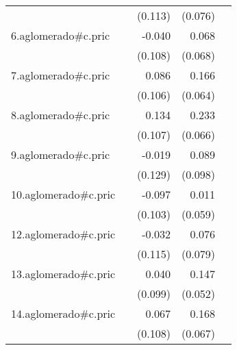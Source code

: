 {\begin{longtable}{l*{4}{D{.}{.}{-1}}}
            &                     &     (0.113)         &     (0.076)         &                     \\
\addlinespace
6.aglomerado#c.pric&                     &      -0.040         &       0.068         &                     \\
            &                     &     (0.108)         &     (0.068)         &                     \\
\addlinespace
7.aglomerado#c.pric&                     &       0.086         &       0.166\sym{**} &                     \\
            &                     &     (0.106)         &     (0.064)         &                     \\
\addlinespace
8.aglomerado#c.pric&                     &       0.134         &       0.233\sym{***}&                     \\
            &                     &     (0.107)         &     (0.066)         &                     \\
\addlinespace
9.aglomerado#c.pric&                     &      -0.019         &       0.089         &                     \\
            &                     &     (0.129)         &     (0.098)         &                     \\
\addlinespace
10.aglomerado#c.pric&                     &      -0.097         &       0.011         &                     \\
            &                     &     (0.103)         &     (0.059)         &                     \\
\addlinespace
12.aglomerado#c.pric&                     &      -0.032         &       0.076         &                     \\
            &                     &     (0.115)         &     (0.079)         &                     \\
\addlinespace
13.aglomerado#c.pric&                     &       0.040         &       0.147\sym{**} &                     \\
            &                     &     (0.099)         &     (0.052)         &                     \\
\addlinespace
14.aglomerado#c.pric&                     &       0.067         &       0.168\sym{*}  &                     \\
            &                     &     (0.108)         &     (0.067)         &                     \\

\end{longtable}}
